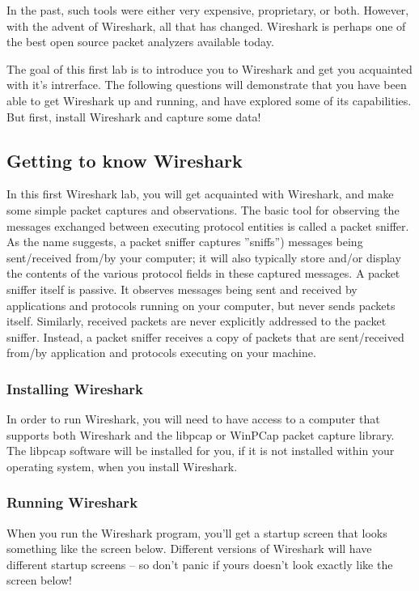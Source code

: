 \documentclass[11pt,a4paper]{article}
\begin{document}
In the past, such tools were either very expensive, proprietary, or both. However, with the advent of Wireshark, all that has changed. Wireshark is perhaps one of the best open source packet analyzers available today.

The goal of this first lab is to introduce you to Wireshark and get you acquainted with it's intrerface. The following questions will demonstrate that you have been able to get Wireshark up and running, and have explored some of its capabilities.
But first, install Wireshark and capture some data!

\subsection{Getting to know Wireshark}
In this first Wireshark lab, you will get acquainted with Wireshark, and make some simple packet captures and observations.
The basic tool for observing the messages exchanged between executing protocol entities is called a packet sniffer. As the name suggests, a packet sniffer captures ''sniffs'') messages being sent/received from/by your computer; it will also typically store and/or display the contents of the various protocol fields in these captured messages. A packet sniffer itself is passive. It observes messages being sent and received by applications and protocols running on your computer, but never sends packets itself. Similarly, received packets are never explicitly addressed to the packet sniffer. Instead, a packet sniffer receives a copy of packets that are sent/received from/by application and protocols executing on your machine.

\subsubsection{Installing Wireshark}
In order to run Wireshark, you will need to have access to a computer that supports both
Wireshark and the libpcap or WinPCap packet capture library. The libpcap software will
be installed for you, if it is not installed within your operating system, when you install Wireshark.

\subsubsection{Running Wireshark}
When you run the Wireshark program, you'll get a startup screen that looks something
like the screen below. Different versions of Wireshark will have different startup screens
-- so don't panic if yours doesn't look exactly like the screen below!
\end{document}
